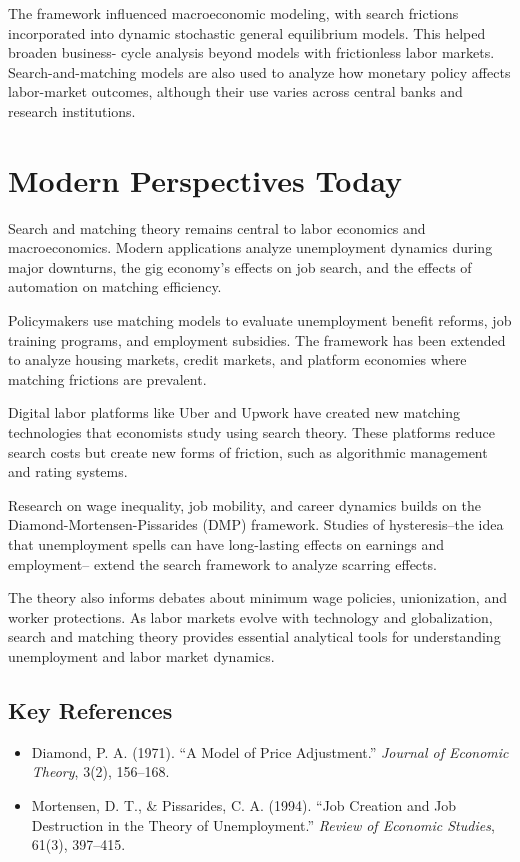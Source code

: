 The framework influenced macroeconomic modeling, with search frictions incorporated
into dynamic stochastic general equilibrium models. This helped broaden business-
cycle analysis beyond models with frictionless labor markets. Search-and-matching
models are also used to analyze how monetary policy affects labor-market outcomes,
although their use varies across central banks and research institutions.

\section{Modern Perspectives Today}
Search and matching theory remains central to labor economics and macroeconomics.
Modern applications analyze unemployment dynamics during major downturns, the gig
economy's effects on job search, and the effects of automation on matching
efficiency.

Policymakers use matching models to evaluate unemployment benefit reforms, job
training programs, and employment subsidies. The framework has been extended to
analyze housing markets, credit markets, and platform economies where matching
frictions are prevalent.

Digital labor platforms like Uber and Upwork have created new matching
technologies that economists study using search theory. These platforms reduce
search costs but create new forms of friction, such as algorithmic management
and rating systems.

Research on wage inequality, job mobility, and career dynamics builds on the
Diamond-Mortensen-Pissarides (DMP) framework. Studies of hysteresis--the idea
that unemployment spells can have long-lasting effects on earnings and employment--
extend the search framework to analyze scarring effects.

The theory also informs debates about minimum wage policies, unionization, and
worker protections. As labor markets evolve with technology and globalization,
search and matching theory provides essential analytical tools for understanding
unemployment and labor market dynamics.

\subsection*{Key References}
\begin{itemize}
    \item Diamond, P. A. (1971). ``A Model of Price Adjustment.'' \textit{Journal of Economic Theory}, 3(2), 156--168.
    \item Mortensen, D. T., \& Pissarides, C. A. (1994). ``Job Creation and Job Destruction in the Theory of Unemployment.'' \textit{Review of Economic Studies}, 61(3), 397--415.
\end{itemize}

